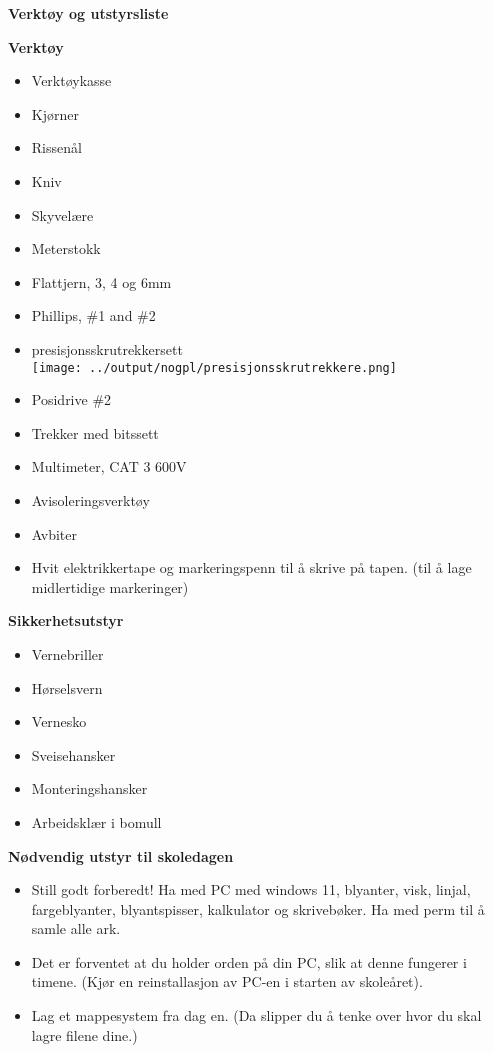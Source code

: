 


\centerline{\bf Verktøy og utstyrsliste }

\vskip 10pt


\noindent
{\bf Verktøy}
\begin{itemize}[itemsep=1mm, parsep=0pt]
	\item Verktøykasse
	\item Kjørner
	\item Rissenål
	\item Kniv
	\item Skyvelære
	\item Meterstokk
	\item Flattjern, 3, 4 og 6mm
	\item Phillips, \#1 and \#2
	\item presisjonsskrutrekkersett\\
       \texttt{[image: ../output/nogpl/presisjonsskrutrekkere.png]}
	\item Posidrive \#2
	\item Trekker med bitssett
	\item Multimeter, CAT 3 600V 
	\item Avisoleringsverktøy
	\item Avbiter
	\item Hvit elektrikkertape og markeringspenn til å skrive på tapen. (til å lage midlertidige markeringer)
\medskip
\end{itemize}
\vskip 10pt

\noindent
{\bf Sikkerhetsutstyr}
\begin{itemize}[itemsep=1mm, parsep=0pt]
	\item Vernebriller
	\item Hørselsvern
	\item Vernesko
	\item Sveisehansker
	\item Monteringshansker
	\item Arbeidsklær i bomull
\medskip
\end{itemize}
\vskip 10pt

\noindent
{\bf Nødvendig utstyr til skoledagen}
\begin{itemize}[itemsep=1mm, parsep=0pt]
	
	\item Still godt forberedt! Ha med PC med windows 11, blyanter, visk, linjal, fargeblyanter, blyantspisser, kalkulator og skrivebøker. Ha med perm til å samle alle ark.
	\item Det er forventet at du holder orden på din PC, slik at denne fungerer i timene. (Kjør en reinstallasjon av PC-en i starten av skoleåret). 
	\item Lag et mappesystem fra dag en. (Da slipper du å tenke over hvor du skal lagre filene dine.)
\medskip
\end{itemize}
\vskip 10pt



\vfil

\eject


